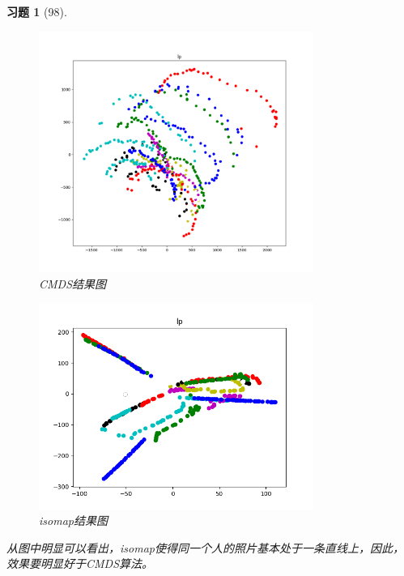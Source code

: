 \documentclass[a4paper, UTF8]{ctexart}
\newtheorem*{exercise}{\textbf{习题}}
\begin{document}
  \begin{exercise}[98]
    \begin{figure}[htbp!]
      \centering
      \includegraphics[width=0.8\textwidth]{fig77_1.png}
      \caption{CMDS结果图}
    \end{figure}
    \begin{figure}[htbp!]
      \centering
      \includegraphics[width=0.8\textwidth]{fig98.png}
      \caption{isomap结果图}
    \end{figure}
    从图中明显可以看出，isomap使得同一个人的照片基本处于一条直线上，因此，效果要明显好于CMDS算法。
  \end{exercise}
  \clearpage
\end{document}
